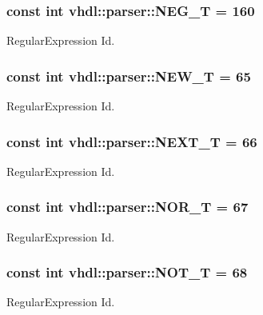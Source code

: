 \subsubsection[{N\+E\+G\+\_\+\+T}]{\setlength{\rightskip}{0pt plus 5cm}const int vhdl\+::parser\+::\+N\+E\+G\+\_\+\+T = 160}\label{namespacevhdl_1_1parser_a38e064a2c0f63d96a97a67e25f18092e}
Regular\+Expression Id. \hypertarget{namespacevhdl_1_1parser_aea267c8d47c6f8e5304364d845918bc7}{}
\subsubsection[{N\+E\+W\+\_\+\+T}]{\setlength{\rightskip}{0pt plus 5cm}const int vhdl\+::parser\+::\+N\+E\+W\+\_\+\+T = 65}\label{namespacevhdl_1_1parser_aea267c8d47c6f8e5304364d845918bc7}
Regular\+Expression Id. \hypertarget{namespacevhdl_1_1parser_aa3a9657df68f1f4ad21321d8aba85507}{}
\subsubsection[{N\+E\+X\+T\+\_\+\+T}]{\setlength{\rightskip}{0pt plus 5cm}const int vhdl\+::parser\+::\+N\+E\+X\+T\+\_\+\+T = 66}\label{namespacevhdl_1_1parser_aa3a9657df68f1f4ad21321d8aba85507}
Regular\+Expression Id. \hypertarget{namespacevhdl_1_1parser_a4b104532591b8a2f6db8a0888b2d9c8c}{}
\subsubsection[{N\+O\+R\+\_\+\+T}]{\setlength{\rightskip}{0pt plus 5cm}const int vhdl\+::parser\+::\+N\+O\+R\+\_\+\+T = 67}\label{namespacevhdl_1_1parser_a4b104532591b8a2f6db8a0888b2d9c8c}
Regular\+Expression Id. \hypertarget{namespacevhdl_1_1parser_a110a175e842ce85d4ec0973695519f54}{}
\subsubsection[{N\+O\+T\+\_\+\+T}]{\setlength{\rightskip}{0pt plus 5cm}const int vhdl\+::parser\+::\+N\+O\+T\+\_\+\+T = 68}\label{namespacevhdl_1_1parser_a110a175e842ce85d4ec0973695519f54}
Regular\+Expression Id. \hypertarget{namespacevhdl_1_1parser_a5002a05549b33e7c4fc8732a8be36884}{}
